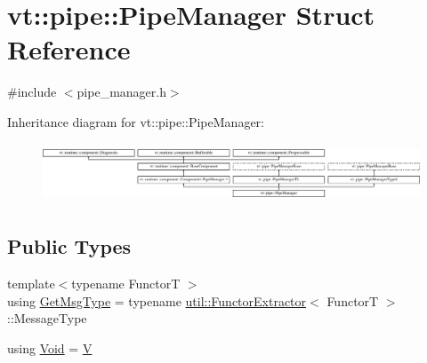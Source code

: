 \hypertarget{structvt_1_1pipe_1_1_pipe_manager}{}\section{vt\+:\+:pipe\+:\+:Pipe\+Manager Struct Reference}
\label{structvt_1_1pipe_1_1_pipe_manager}


{\ttfamily \#include $<$pipe\+\_\+manager.\+h$>$}

Inheritance diagram for vt\+:\+:pipe\+:\+:Pipe\+Manager\+:\begin{figure}[H]
\begin{center}
\leavevmode
\includegraphics[height=1.789137cm]{structvt_1_1pipe_1_1_pipe_manager}
\end{center}
\end{figure}
\subsection*{Public Types}
\begin{DoxyCompactItemize}
\item 
{\footnotesize template$<$typename FunctorT $>$ }\\using \hyperlink{structvt_1_1pipe_1_1_pipe_manager_a221ce8bc0fc6639f43dad1e53a08c0d2}{Get\+Msg\+Type} = typename \hyperlink{structvt_1_1util_1_1_functor_extractor}{util\+::\+Functor\+Extractor}$<$ FunctorT $>$\+::Message\+Type
\item 
using \hyperlink{structvt_1_1pipe_1_1_pipe_manager_ab720c2580ecfd3ab36e49aeaaff64cc6}{Void} = \hyperlink{structvt_1_1pipe_1_1_pipe_manager_t_l_a8d394521df58abfd90c1d81c998f22e3}{V}
\end{DoxyCompactItemize}
